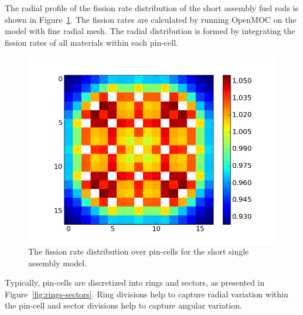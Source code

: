 The radial profile of the fission rate distribution of the short assembly fuel rods is shown in Figure~\ref{fig:short-assembly-radial}. The fission rates are calculated by running OpenMOC on the model with fine radial mesh. The radial distribution is formed by integrating the fission rates of all materials within each pin-cell.

\begin{figure}[h!]
	\centering
	\includegraphics[width=0.7\linewidth]{figures/results/rr-plots/short-assembly-radial.png}
	\caption[]{The fission rate distribution over pin-cells for the short single assembly model.}
	\label{fig:short-assembly-radial}
\end{figure}

Typically, pin-cells are discretized into rings and sectors, as presented in Figure~\ref{fig:rings-sectors}. Ring divisions help to capture radial variation within the pin-cell and sector divisions help to capture angular variation.

